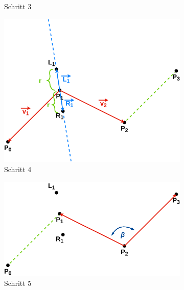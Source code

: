 \documentclass[doktyp=studarbeit]{TUBAFarbeiten}
\begin{document}
\begin{figure}[!htb]
\begin{subfigure}[b]{0.35\textwidth}
        \caption{Schritt 3}
    \end{subfigure}
    \qquad
    \begin{subfigure}[b]{0.35\textwidth}
        \centering
        \includegraphics[width=1\linewidth]{Schlangenlinie-4.png}
        \caption{Schritt 4}
    \end{subfigure}
    \qquad
    \begin{subfigure}[b]{0.35\textwidth}
        \centering
        \includegraphics[width=1\linewidth]{Schlangenlinie-5.png}
        \caption{Schritt 5}
    \end{subfigure}
    \qquad
    \begin{subfigure}[b]{0.35\textwidth}
        \centering

\end{subfigure}
\end{figure}
\end{document}
